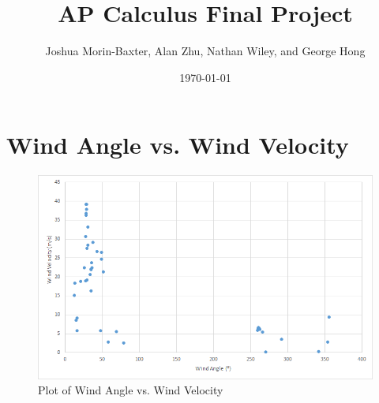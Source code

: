 \documentclass{journal}
\begin{document}
\title{AP Calculus Final Project}
\author{Joshua Morin-Baxter, Alan Zhu, Nathan Wiley, and George Hong}
\date{\today}

\maketitle

\part{Wind Angle vs. Wind Velocity}
\begin{figure}[H]
  \centering
  \includegraphics[width=6in]{alan-data.png}
  \caption{Plot of Wind Angle vs. Wind Velocity}
\end{figure}
\end{document}
